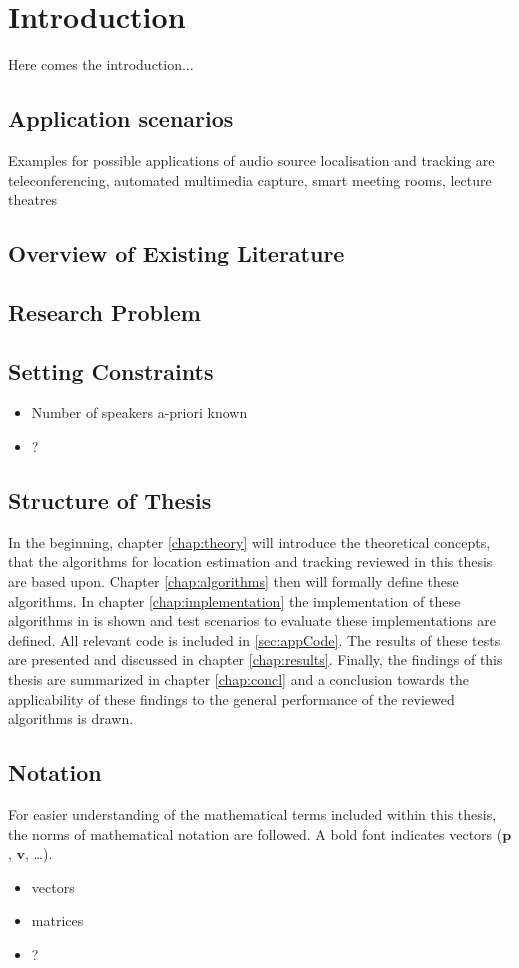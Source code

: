 \chapter{Introduction}
Here comes the introduction...
\section{Application scenarios}
Examples for possible applications of audio source localisation and tracking are teleconferencing, automated multimedia capture, smart meeting rooms, lecture theatres \cite{Lehmann2007}
\section{Overview of Existing Literature}
\section{Research Problem}
\section{Setting Constraints}
\begin{itemize}
	\item Number of speakers a-priori known
	\item ?
\end{itemize}
\section{Structure of Thesis}
	In the beginning, chapter \ref{chap:theory} will introduce the theoretical concepts, that the algorithms for location estimation and tracking reviewed in this thesis are based upon. Chapter \ref{chap:algorithms} then will formally define these algorithms. In chapter \ref{chap:implementation} the implementation of these algorithms in \matlab is shown and test scenarios to evaluate these implementations are defined. All relevant code is included in \ref{sec:appCode}. The results of these tests are presented and discussed in chapter \ref{chap:results}. Finally, the findings of this thesis are summarized in chapter \ref{chap:concl} and a conclusion towards the applicability of these findings to the general performance of the reviewed algorithms is drawn.
\section{Notation}
\newcommand{\vect}[1]{\mathbf{#1}}
For easier understanding of the mathematical terms included within this thesis, the norms of mathematical notation are followed. A bold font indicates vectors ($\vect{p}$, $\vect{v}$, \dots).

\begin{itemize}
	\item vectors
	\item matrices
	\item ?
\end{itemize}
